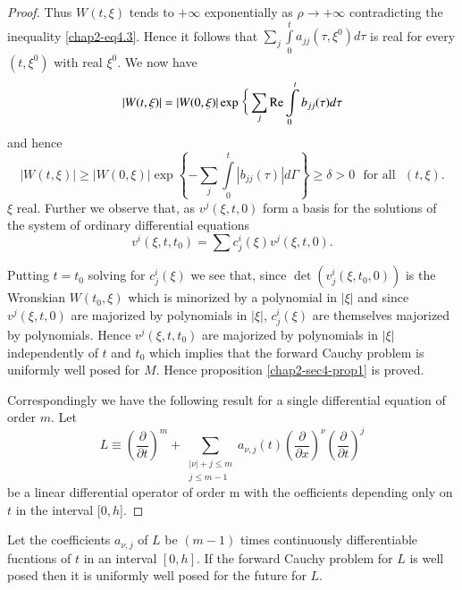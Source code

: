 \begin{proof}
Thus $W(t, \xi)$ tends to $+\infty$ exponentially as $\rho \to +
\infty$ contradicting the inequality \eqref{chap2-eq4.3}. Hence it follows that
$\sum\limits_{j} \int\limits^{t}_{0} a_{jj} (\tau,  \xi^0) d \tau $ is
real for every $(t, \xi^0)$ with real $\xi^{0}$. We now have  
$$
| W (t, \xi) | = | W(0, \xi) | \exp \bigg\{\sum\limits_{j} \operatorname{Re}
\int\limits^{t}_{0} b_{jj} (\tau)d\tau 
$$
and hence 
$$
|W (t, \xi) | \geq | W(0, \xi) |\exp \left\{-\sum\limits_{j}
\int\limits^{t}_{0} | b_{jj} (\tau) | d \Gamma\right\} \geq \delta > 0 \text{~
  for all~ } (t, \xi). 
$$
$\xi$ real. Further we observe that, as $v^j (\xi, t, 0)$ form a basis 
for the solutions of the system of ordinary differential equations
$$
v^i (\xi, t, t_0) = \sum c^i_j (\xi) v^j (\xi ,  t, 0).
$$\pageoriginale  

Putting $t=t_0$ solving for $c^i_j (\xi)$ we see that,  since $ 
\det (v_j^i(\xi , t_0 ,  0))$ is the Wronskian $W(t_0, \xi)$
which is minorized by a polynomial in $|\xi|$ and since $v^j (\xi ,
t, 0)$ are majorized by polynomials in $|\xi|$, $c^i_j (\xi)$ are
themselves majorized by polynomials. Hence $v^j (\xi, t, t_0) $ are
majorized by polynomials in $|\xi|$ independently of $t$ and $t_0$
which implies that the forward Cauchy problem is uniformly well posed
for $M$. Hence proposition \ref{chap2-sec4-prop1} is proved.  

Correspondingly we have the following result for a single differential
equation of order $m$. Let  
\begin{equation}
  L \equiv \left(\dfrac{\partial}{\partial t}\right)^m + \sum _{\substack{|\nu| +
      j \leq m\\j\leq m-1 }} a_{\nu, j} (t)\left(\dfrac{\partial}{\partial
    x}\right)^\nu \left(\dfrac{\partial}{\partial t}\right)^j
  \tag{4.4}\label{chap2-eq4.4}  
\end{equation}
be a linear differential operator of order m with the oefficients
depending only on $t$ in the interval [$0, h$]. 
\end{proof}

\begin{proposition}\label{chap2-sec4-prop2}%
Let the coefficients $ a_{\nu, j}$ of $L$  be $(m-1)$ times 
continuously differentiable fucntions of $t$ in an interval $[0, h]$.   
If the forward Cauchy problem for $L$ is well posed then it is
uniformly well posed for the future for $L$. 
\end{proposition}

